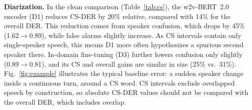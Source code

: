 \documentclass{article}
\newcommand{\rel}[1]{\,{\scriptsize(${-}#1$)}}
\begin{document}


\noindent\textbf{Diarization.}
In the clean comparison (Table~\ref{tab:cs}), the w2v-BERT~2.0 encoder (D1) reduces CS-DER by 20\% relative, compared with 14\% for the overall DER.
This reduction comes from speaker confusion, which drops by 45\% (1.62$\rightarrow$0.89), while false alarms slightly increase. As CS intervals contain only single-speaker speech, this means D1 more often hypothesizes a spurious second speaker there.
In-domain fine-tuning (D3) further lowers confusion only slightly (0.89$\rightarrow$0.81), and its CS and overall gains are similar in size (25\% vs.\ 31\%). 
Fig.~\ref{fig:example} illustrates the typical baseline error: a sudden speaker change inside a continuous turn, around a CS word.
CS intervals exclude overlapped speech by construction, so absolute CS-DER values should not be compared with the overall DER, which includes overlap.
\end{document}
